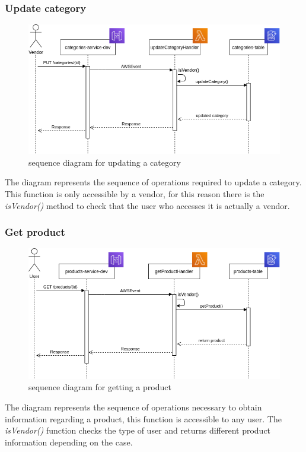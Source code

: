\subsubsection{Update category}
\begin{figure}[!h]
    \vspace{5px}
    \includegraphics[scale=0.5]{../../../../Images/Diagrammi/maintainerManual/updateCategorySequence.png}
    \centering
    \caption{sequence diagram for updating a category}
\end{figure}
The diagram represents the sequence of operations required to update a category. This function is only accessible by a vendor, for this reason there is the \textit{isVendor()} method to check that the user who accesses it is actually a vendor.
\pagebreak
\subsubsection{Get product}
\begin{figure}[!h]
    \vspace{5px}
    \includegraphics[scale=0.5]{../../../../Images/Diagrammi/maintainerManual/getProductSequence.png}
    \centering
    \caption{sequence diagram for getting a product}
\end{figure}
The diagram represents the sequence of operations necessary to obtain information regarding a product, this function is accessible to any user. The \textit{isVendor()} function checks the type of user and returns different product information depending on the case.

